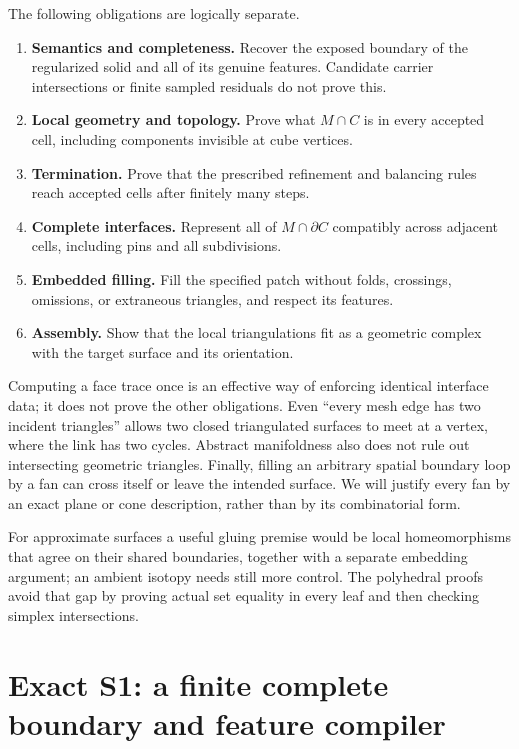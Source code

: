 \documentclass[11pt]{article}
\theoremstyle{definition}
\theoremstyle{remark}
\begin{document}
The following obligations are logically separate.
\begin{enumerate}[label=\textbf{O\arabic*.}]
\item \textbf{Semantics and completeness.} Recover the exposed boundary
  of the regularized solid and all of its genuine features. Candidate
  carrier intersections or finite sampled residuals do not prove this.
\item \textbf{Local geometry and topology.} Prove what $M\cap C$ is in
  every accepted cell, including components invisible at cube vertices.
\item \textbf{Termination.} Prove that the prescribed refinement and
  balancing rules reach accepted cells after finitely many steps.
\item \textbf{Complete interfaces.} Represent all of $M\cap\partial C$
  compatibly across adjacent cells, including pins and all subdivisions.
\item \textbf{Embedded filling.} Fill the specified patch without folds,
  crossings, omissions, or extraneous triangles, and respect its features.
\item \textbf{Assembly.} Show that the local triangulations fit as a
  geometric complex with the target surface and its orientation.
\end{enumerate}

Computing a face trace once is an effective way of enforcing identical
interface data; it does not prove the other obligations. Even ``every mesh
edge has two incident triangles'' allows two closed triangulated surfaces
to meet at a vertex, where the link has two cycles. Abstract manifoldness
also does not rule out intersecting geometric triangles. Finally, filling
an arbitrary spatial boundary loop by a fan can cross itself or leave the
intended surface. We will justify every fan by an exact plane or cone
description, rather than by its combinatorial form.

For approximate surfaces a useful gluing premise would be local
homeomorphisms that agree on their shared boundaries, together with a
separate embedding argument; an ambient isotopy needs still more control.
The polyhedral proofs avoid that gap by proving actual set equality in
every leaf and then checking simplex intersections.

\section{Exact S1: a finite complete boundary and feature compiler}
\label{sec:s1}
\end{document}
